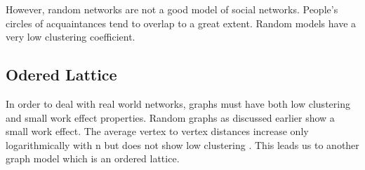 %
%
%
However,  random  networks  are  not  a  good  model  of  social  networks.  People’s  circles  of  
acquaintances  tend  to  overlap  to  a  great  extent. Random models have a very low clustering coefficient.
\subsection{Odered Lattice}
In order to deal with real world networks, graphs must have both low clustering and small work effect properties. Random graphs as discussed earlier show a small work effect. The average vertex to vertex distances increase only logarithmically with n but does not show low clustering \citep{newman2000models}. This leads us to another graph model which is an ordered lattice.

